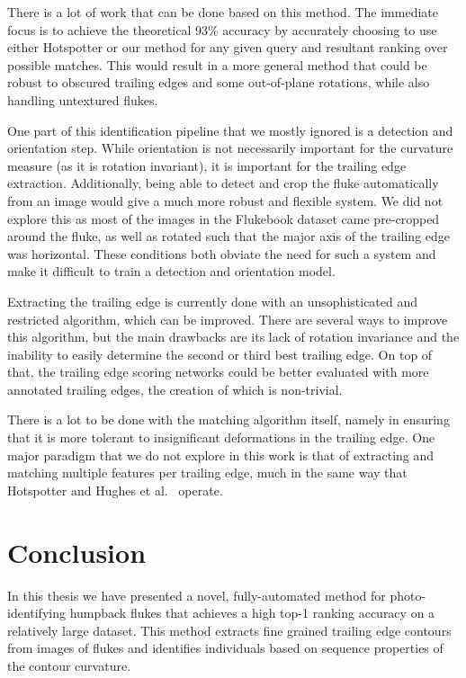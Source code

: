 There is a lot of work that can be done based on this method.
The immediate focus is to achieve the theoretical 93\% accuracy by accurately choosing to use either Hotspotter or our method for any given query and resultant ranking over possible matches.
This would result in a more general method that could be robust to obscured trailing edges and some out-of-plane rotations, while also handling untextured flukes.

One part of this identification pipeline that we mostly ignored is a detection and orientation step.
While orientation is not necessarily important for the curvature measure (as it is rotation invariant), it is important for the trailing edge extraction.
Additionally, being able to detect and crop the fluke automatically from an image would give a much more robust and flexible system.
We did not explore this as most of the images in the Flukebook dataset came pre-cropped around the fluke, as well as rotated such that the major axis of the trailing edge was horizontal.
These conditions both obviate the need for such a system and make it difficult to train a detection and orientation model.

Extracting the trailing edge is currently done with an unsophisticated and restricted algorithm, which can be improved. 
There are several ways to improve this algorithm, but the main drawbacks are its lack of rotation invariance and the inability to easily determine the second or third best trailing edge.
On top of that, the trailing edge scoring networks could be better evaluated with more annotated trailing edges, the creation of which is non-trivial.

There is a lot to be done with the matching algorithm itself, namely in ensuring that it is more tolerant to insignificant deformations in the trailing edge.
One major paradigm that we do not explore in this work is that of extracting and matching multiple features per trailing edge, much in the same way that Hotspotter and Hughes et al.\ \cite{hughes2015automated} operate.

\section{Conclusion}

In this thesis we have presented a novel, fully-automated method for photo-identifying humpback flukes that achieves a high top-1 ranking accuracy on a relatively large dataset.
This method extracts fine grained trailing edge contours from images of flukes and identifies individuals based on sequence properties of the contour curvature.

